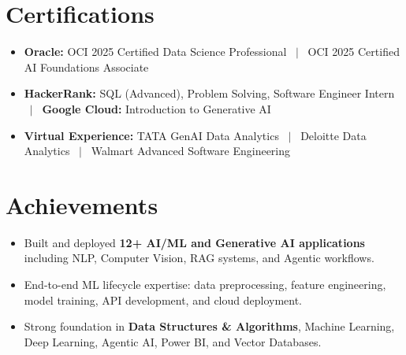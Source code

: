 \documentclass[a4paper,9pt]{article}
\newcommand{\resumeItem}[1]{\item\small #1}
\begin{document}
\vspace{-2mm}

\section{Certifications}
\begin{itemize}
\resumeItem{\textbf{Oracle:} OCI 2025 Certified Data Science Professional ~$|$~ OCI 2025 Certified AI Foundations Associate}
\resumeItem{\textbf{HackerRank:} SQL (Advanced), Problem Solving, Software Engineer Intern ~$|$~ \textbf{Google Cloud:} Introduction to Generative AI}
\resumeItem{\textbf{Virtual Experience:} TATA GenAI Data Analytics ~$|$~ Deloitte Data Analytics ~$|$~ Walmart Advanced Software Engineering}
\end{itemize}

\vspace{-2mm}

\section{Achievements}
\begin{itemize}
\resumeItem{Built and deployed \textbf{12+ AI/ML and Generative AI applications} including NLP, Computer Vision, RAG systems, and Agentic workflows.}
\resumeItem{End-to-end ML lifecycle expertise: data preprocessing, feature engineering, model training, API development, and cloud deployment.}
\resumeItem{Strong foundation in \textbf{Data Structures \& Algorithms}, Machine Learning, Deep Learning, Agentic AI, Power BI, and Vector Databases.}
\end{itemize}
\end{document}
